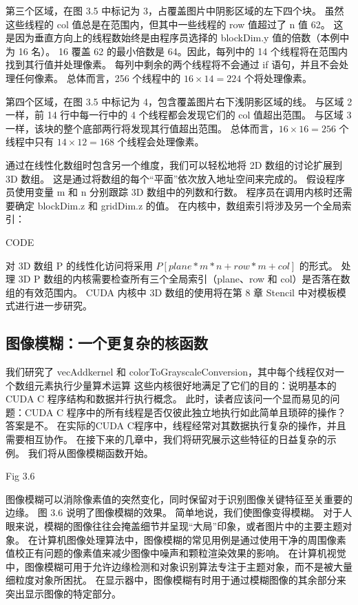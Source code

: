 第三个区域，在图 3.5 中标记为 3，占覆盖图片中阴影区域的左下四个块。 
虽然这些线程的 col 值总是在范围内，但其中一些线程的 row 值超过了 n 值 62。
这是因为垂直方向上的线程数始终是由程序员选择的 blockDim.y 值的倍数（本例中为 16 名）。 
16 覆盖 62 的最小倍数是 64。因此，每列中的 14 个线程将在范围内找到其行值并处理像素。 
每列中剩余的两个线程将不会通过 if 语句，并且不会处理任何像素。 
总体而言，256 个线程中的 $16 \times 14 = 224$ 个将处理像素。

第四个区域，在图 3.5 中标记为 4，包含覆盖图片右下浅阴影区域的线。 
与区域 2 一样，前 14 行中每一行中的 4 个线程都会发现它们的 col 值超出范围。 
与区域 3 一样，该块的整个底部两行将发现其行值超出范围。 
总体而言，$16 \times 16 = 256$ 个线程中只有 $14 \times 12 = 168$ 个线程会处理像素。

通过在线性化数组时包含另一个维度，我们可以轻松地将 2D 数组的讨论扩展到 3D 数组。 
这是通过将数组的每个“平面”依次放入地址空间来完成的。 假设程序员使用变量 m 和 n 分别跟踪 3D 数组中的列数和行数。 
程序员在调用内核时还需要确定 blockDim.z 和 gridDim.z 的值。 在内核中，数组索引将涉及另一个全局索引：

{\color{red} CODE}

对 3D 数组 P 的线性化访问将采用 $P[plane * m * n +row * m+col]$ 的形式。 
处理 3D P 数组的内核需要检查所有三个全局索引（plane、row 和 col）是否落在数组的有效范围内。 
CUDA 内核中 3D 数组的使用将在第 8 章 Stencil 中对模板模式进行进一步研究。

\subsection{图像模糊：一个更复杂的核函数}
我们研究了 vecAddkernel 和 colorToGrayscaleConversion，其中每个线程仅对一个数组元素执行少量算术运算
这些内核很好地满足了它们的目的：说明基本的 CUDA C 程序结构和数据并行执行概念。 
此时，读者应该问一个显而易见的问题：CUDA C 程序中的所有线程是否仅彼此独立地执行如此简单且琐碎的操作？ 答案是不。 
在实际的CUDA C程序中，线程经常对其数据执行复杂的操作，并且需要相互协作。 
在接下来的几章中，我们将研究展示这些特征的日益复杂的示例。 我们将从图像模糊函数开始。

{\color{red} Fig 3.6}

图像模糊可以消除像素值的突然变化，同时保留对于识别图像关键特征至关重要的边缘。 图 3.6 说明了图像模糊的效果。 
简单地说，我们使图像变得模糊。 对于人眼来说，模糊的图像往往会掩盖细节并呈现“大局”印象，或者图片中的主要主题对象。 
在计算机图像处理算法中，图像模糊的常见用例是通过使用干净的周围像素值校正有问题的像素值来减少图像中噪声和颗粒渲染效果的影响。 
在计算机视觉中，图像模糊可用于允许边缘检测和对象识别算法专注于主题对象，而不是被大量细粒度对象所困扰。 
在显示器中，图像模糊有时用于通过模糊图像的其余部分来突出显示图像的特定部分。

